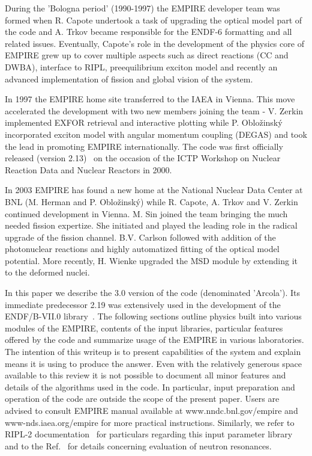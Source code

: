 \documentclass[twocolumn,amsmath,amssymb,10pt,groupedaddress,a4paper]{revtex4}
\begin{document}
During the 'Bologna period' (1990-1997) the EMPIRE developer team was formed when R. Capote undertook a task of upgrading the optical model part of the code and A. Trkov became responsible for the ENDF-6 formatting and all related issues. Eventually, Capote's role in the development of the physics core of EMPIRE grew up to cover multiple aspects such as direct reactions (CC and DWBA), interface to RIPL, preequilibrium exciton model and recently an advanced implementation of fission and global vision of the system.

In 1997 the EMPIRE home site transferred to the IAEA in Vienna. This move accelerated the development with two new members joining the team - V. Zerkin implemented EXFOR retrieval and interactive plotting while P. Oblo\v zinsk\'y incorporated exciton model with angular momentum coupling (DEGAS) and took the lead in promoting EMPIRE internationally. The code was first officially released (version 2.13)~\cite{EMPIRE:Trieste01} on the occasion of the ICTP Workshop on Nuclear Reaction Data and Nuclear Reactors in 2000.

In 2003 EMPIRE has found a new home at the National Nuclear Data Center at BNL (M. Herman and P. Oblo\v zinsk\'y) while R. Capote, A. Trkov and V. Zerkin continued development in Vienna. M. Sin joined the team bringing the much needed fission expertize. She initiated and played the leading role in the radical upgrade of the fission channel. B.V. Carlson followed with addition of the photonuclear reactions and highly automatized fitting of the optical model potential. More recently, H. Wienke upgraded the MSD module by extending it to the deformed nuclei.

In this paper we describe the 3.0 version of the code (denominated 'Arcola'). Its immediate predecessor 2.19 was extensively used in the development of the ENDF/B-VII.0 library~\cite{ENDF-VII}. The following sections outline physics built into various modules of the EMPIRE, contents of the input libraries, particular features offered by the code and summarize usage of the EMPIRE in various laboratories. The intention of this writeup is to present capabilities of the system and explain means it is using to produce the answer. Even with the relatively generous space available to this review it is not possible to document all minor features and details of the algorithms used in the code. In particular, input preparation and operation of the code are outside the scope of the present paper. Users are advised to consult EMPIRE manual available at www.nndc.bnl.gov/empire and www-nds.iaea.org/empire for more practical instructions. Similarly, we
refer to RIPL-2 documentation~\cite{RIPL-2} for particulars regarding this input parameter library and to the Ref.~\cite{Mughabghab:06} for details concerning evaluation of neutron resonances.
\end{document}

